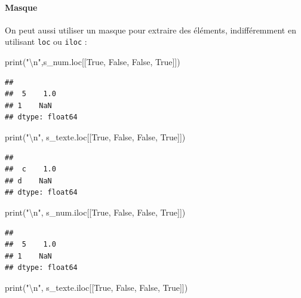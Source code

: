 \documentclass[
  12pt,
]{book}
\newenvironment{Shaded}{\begin{snugshade}}{\end{snugshade}}
\newcommand{\BuiltInTok}[1]{#1}
\newcommand{\CharTok}[1]{\textcolor[rgb]{0.31,0.60,0.02}{#1}}
\newcommand{\NormalTok}[1]{#1}
\newcommand{\StringTok}[1]{\textcolor[rgb]{0.31,0.60,0.02}{#1}}
\newcommand{\VariableTok}[1]{\textcolor[rgb]{0.00,0.00,0.00}{#1}}
\numberwithin{equation}{section}
\numberwithin{countremarque}{section}
\begin{document}
\paragraph{Masque}\label{masque}

On peut aussi utiliser un masque pour extraire des éléments, indifféremment en utilisant \texttt{loc} ou \texttt{iloc} :

\begin{Shaded}
\begin{Highlighting}[]
\BuiltInTok{print}\NormalTok{(}\StringTok{"}\CharTok{\textbackslash{}n}\StringTok{"}\NormalTok{,s\_num.loc[[}\VariableTok{True}\NormalTok{, }\VariableTok{False}\NormalTok{, }\VariableTok{False}\NormalTok{, }\VariableTok{True}\NormalTok{]])}
\end{Highlighting}
\end{Shaded}

\begin{lstlisting}
## 
##  5    1.0
## 1    NaN
## dtype: float64
\end{lstlisting}

\begin{Shaded}
\begin{Highlighting}[]
\BuiltInTok{print}\NormalTok{(}\StringTok{"}\CharTok{\textbackslash{}n}\StringTok{"}\NormalTok{, s\_texte.loc[[}\VariableTok{True}\NormalTok{, }\VariableTok{False}\NormalTok{, }\VariableTok{False}\NormalTok{, }\VariableTok{True}\NormalTok{]])}
\end{Highlighting}
\end{Shaded}

\begin{lstlisting}
## 
##  c    1.0
## d    NaN
## dtype: float64
\end{lstlisting}

\begin{Shaded}
\begin{Highlighting}[]
\BuiltInTok{print}\NormalTok{(}\StringTok{"}\CharTok{\textbackslash{}n}\StringTok{"}\NormalTok{, s\_num.iloc[[}\VariableTok{True}\NormalTok{, }\VariableTok{False}\NormalTok{, }\VariableTok{False}\NormalTok{, }\VariableTok{True}\NormalTok{]])}
\end{Highlighting}
\end{Shaded}

\begin{lstlisting}
## 
##  5    1.0
## 1    NaN
## dtype: float64
\end{lstlisting}

\begin{Shaded}
\begin{Highlighting}[]
\BuiltInTok{print}\NormalTok{(}\StringTok{"}\CharTok{\textbackslash{}n}\StringTok{"}\NormalTok{, s\_texte.iloc[[}\VariableTok{True}\NormalTok{, }\VariableTok{False}\NormalTok{, }\VariableTok{False}\NormalTok{, }\VariableTok{True}\NormalTok{]])}
\end{Highlighting}
\end{Shaded}
\end{document}
